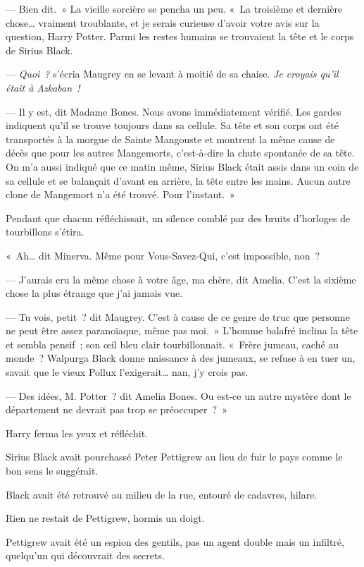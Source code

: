 --- Bien dit.~»
La vieille sorcière se pencha un peu.
«~La troisième et dernière chose… vraiment troublante, et je serais curieuse d'avoir votre avis sur la question, Harry Potter.
Parmi les restes humains se trouvaient la tête et le corps de Sirius Black.

--- \emph{Quoi~?} s'écria Maugrey en se levant à moitié de sa chaise.
\emph{Je croyais qu'il était à Azkaban~!}

--- Il y est, dit Madame Bones.
Nous avons immédiatement vérifié.
Les gardes indiquent qu'il se trouve toujours dans sa cellule.
Sa tête et son corps ont été transportés à la morgue de Sainte Mangouste et montrent la même cause de décès que pour les autres Mangemorts, c'est-à-dire la chute spontanée de sa tête.
On m'a aussi indiqué que ce matin même, Sirius Black était assis dans un coin de sa cellule et se balançait d'avant en arrière, la tête entre les mains.
Aucun autre clone de Mangemort n'a été trouvé.
Pour l'instant.~»

Pendant que chacun réfléchissait, un silence comblé par des bruits d'horloges de tourbillons s'étira.

«~Ah… dit Minerva.
Même pour Vous-Savez-Qui, c'est impossible, non~?

--- J'aurais cru la même chose à votre âge, ma chère, dit Amelia.
C'est la sixième chose la plus étrange que j'ai jamais vue.

--- Tu vois, petit~? dit Maugrey.
C'est à cause de ce genre de truc que personne ne peut être assez paranoïaque, même pas moi.~»
L'homme balafré inclina la tête et sembla pensif~; son œil bleu clair tourbillonnait.
«~Frère jumeau, caché au monde~?
Walpurga Black donne naissance à des jumeaux, se refuse à en tuer un, savait que le vieux Pollux l'exigerait… nan, j'y crois pas.

--- Des idées, M. Potter~? dit Amelia Bones.
Ou est-ce un autre mystère dont le département ne devrait pas trop se préoccuper~?~»

Harry ferma les yeux et réfléchit.

Sirius Black avait pourchassé Peter Pettigrew au lieu de fuir le pays comme le bon sens le suggérait.

Black avait été retrouvé au milieu de la rue, entouré de cadavres, hilare.

Rien ne restait de Pettigrew, hormis un doigt.

Pettigrew avait été un espion des gentils, pas un agent double mais un infiltré, quelqu'un qui découvrait des secrets.

